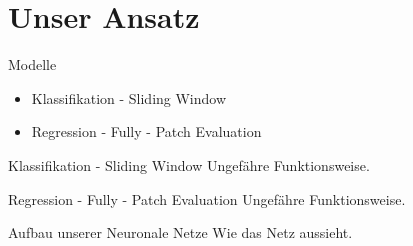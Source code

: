 \section{Unser Ansatz}

\begin{frame}{Modelle}
	


\centering

\begin{itemize}
 \item Klassifikation - Sliding Window \\
 \item Regression - Fully - Patch Evaluation \\
\end{itemize}
\end{frame}

\begin{frame}{Klassifikation - Sliding Window}
	\centering
	Ungefähre Funktionsweise.
\end{frame}

\begin{frame}{Regression - Fully - Patch Evaluation}
	\centering
	Ungefähre Funktionsweise.
\end{frame}

\begin{frame}{Aufbau unserer Neuronale Netze}
	\centering
	Wie das Netz aussieht.
\end{frame}